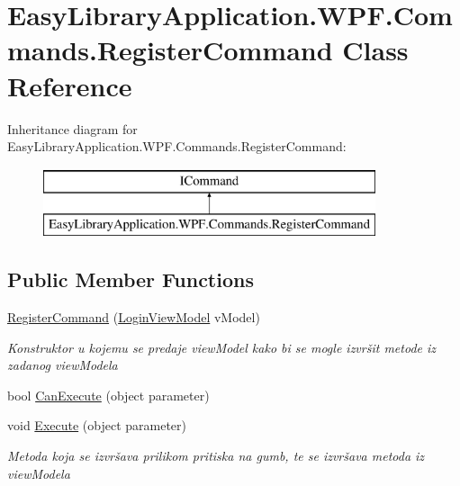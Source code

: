 \hypertarget{class_easy_library_application_1_1_w_p_f_1_1_commands_1_1_register_command}{}\section{Easy\+Library\+Application.\+W\+P\+F.\+Commands.\+Register\+Command Class Reference}
\label{class_easy_library_application_1_1_w_p_f_1_1_commands_1_1_register_command}
Inheritance diagram for Easy\+Library\+Application.\+W\+P\+F.\+Commands.\+Register\+Command\+:\begin{figure}[H]
\begin{center}
\leavevmode
\includegraphics[height=2.000000cm]{class_easy_library_application_1_1_w_p_f_1_1_commands_1_1_register_command}
\end{center}
\end{figure}
\subsection*{Public Member Functions}
\begin{DoxyCompactItemize}
\item 
\mbox{\hyperlink{class_easy_library_application_1_1_w_p_f_1_1_commands_1_1_register_command_a12a1a0a468b2e1aeeb10e4860fb9df00}{Register\+Command}} (\mbox{\hyperlink{class_easy_library_application_1_1_w_p_f_1_1_view_model_1_1_login_view_model}{Login\+View\+Model}} v\+Model)
\begin{DoxyCompactList}\small\item\em Konstruktor u kojemu se predaje view\+Model kako bi se mogle izvršit metode iz zadanog view\+Modela \end{DoxyCompactList}\item 
bool \mbox{\hyperlink{class_easy_library_application_1_1_w_p_f_1_1_commands_1_1_register_command_a5e70be682ef6ad976d166b444c8e2d93}{Can\+Execute}} (object parameter)
\item 
void \mbox{\hyperlink{class_easy_library_application_1_1_w_p_f_1_1_commands_1_1_register_command_a8c70a1266548deb25b4a9289ac3395ba}{Execute}} (object parameter)
\begin{DoxyCompactList}\small\item\em Metoda koja se izvršava prilikom pritiska na gumb, te se izvršava metoda iz view\+Modela \end{DoxyCompactList}\end{DoxyCompactItemize}
